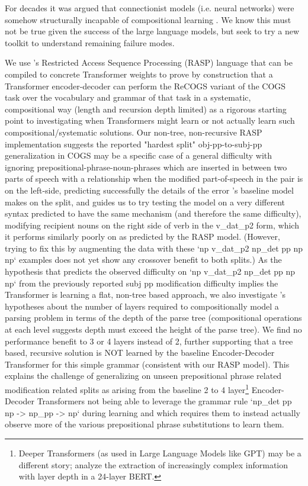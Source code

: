 \documentclass[11pt]{article}
\begin{document}
For decades it was argued that connectionist models (i.e. neural networks) were somehow structurally incapable of compositional learning \cite{FodorPylyshyn1988}. We know this must not be true given the success of the large language models, but seek to try a new toolkit to understand remaining failure modes.

We use \cite{Weiss2021}'s Restricted Access Sequence Processing (RASP) language that can be compiled to concrete Transformer weights to prove by construction that a Transformer encoder-decoder can perform the ReCOGS \cite{Wu2023} variant of the COGS \cite{KimLinzen2020} task over the vocabulary and grammar of that task in a systematic, compositional way (length and recursion depth limited) as a rigorous starting point to investigating when Transformers might learn or not actually learn such compositional/systematic solutions. Our non-tree, non-recursive RASP implementation suggests the reported "hardest split" obj-pp-to-subj-pp generalization in COGS may be a specific case of a general difficulty with ignoring prepositional-phrase-noun-phrases which are inserted in between two parts of speech with a relationship when the modified part-of-speech in the pair is on the left-side, predicting successfully the details of the error \cite{Wu2023}'s baseline model makes on the split, and guides us to try testing the model on a very different syntax predicted to have the same mechanism (and therefore the same difficulty), modifying recipient nouns on the right side of verb in the v\_dat\_p2 form, which it performs similarly poorly on as predicted by the RASP model. (However, trying to fix this by augmenting the data with these `np v\_dat\_p2 np\_det pp np np` examples does not yet show any crossover benefit to both splits.) As the hypothesis that predicts the observed difficulty on `np v\_dat\_p2 np\_det pp np np` from the previously reported subj pp modification difficulty implies the Transformer is learning a flat, non-tree based approach, we also investigate \cite{Csordas2022}'s hypotheses about the number of layers required to compositionally model a parsing problem in terms of the depth of the parse tree (compositional operations at each level suggests depth must exceed the height of the parse tree). We find no performance benefit to 3 or 4 layers instead of 2, further supporting that a tree based, recursive solution is NOT learned by the \cite{Wu2023} baseline Encoder-Decoder Transformer for this simple grammar (consistent with our RASP model). This explains the challenge of generalizing on unseen prepositional phrase related modification related splits as arising from the baseline 2 to 4 layer\footnote{
Deeper Transformers (as used in Large Language Models like GPT) may be a different story; \cite{tenney2019bertrediscoversclassicalnlp} analyze the extraction of increasingly complex information with layer depth in a 24-layer BERT.
} Encoder-Decoder Transformers not being able to leverage the grammar rule `np\_det pp np -> np\_pp -> np` during learning and which requires them to instead actually observe more of the various prepositional phrase substitutions to learn them.
\end{document}
